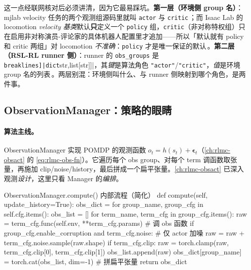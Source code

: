 \begin{insight}\label{ins:rlmc-mgr-asym}
这一点经联网核对后必须讲清，因为它最易踩坑。\textbf{第一层（环境侧 group 名）}：mjlab velocity 任务的两个观测组源码里就叫 \verb|actor| 与 \verb|critic|\,\cite{mjlab2026}；而 Isaac Lab 的 locomotion \emph{velocity 基类}默认\textbf{只}定义一个 \verb|policy| 组，\verb|critic|（非对称特权组）只在启用非对称演员-评论家的具体机器人配置里才追加——所以「默认就有 policy 和 critic 两组」对 locomotion \emph{不准确}：\verb|policy| 才是唯一保证的默认\,\cite{isaaclab2024}。\textbf{第二层（RSL-RL runner 侧）}：runner 的 \verb|obs_groups| 是 \Verb[breaklines]|dict[str,list[str]]|，其\emph{键}是算法角色 \verb|"actor"|/\allowbreak\verb|"critic"|，\emph{值}是环境 group 名的列表\,\cite{schwarke2025rslrl,isaaclab2024}。两层别混：环境侧叫什么、与 runner 侧映射到哪个角色，是两件事。
\end{insight}

\subsection{ObservationManager：策略的眼睛}
\label{sec:rlmc-mgr-obs}

\paragraph{算法主线。}ObservationManager 实现 POMDP 的观测函数 $o_t=h(s_t)+\boldsymbol\epsilon_t$（\cref{ch:rlmc-obsact} 的 \cref{eq:rlmc-obs-fn}）。它遍历每个 obs group、对每个 term 调函数取张量，再施加 clip/noise/history，最后拼成一个扁平张量。\cref{ch:rlmc-obsact} 已深入观测\emph{设计}，这里只看 Manager 的\emph{编排}。

\begin{codebox}[Python]{ObservationManager.compute() 内部流程（简化）}
def compute(self, update_history=True):
    obs_dict = {}
    for group_name, group_cfg in self.cfg.items():
        obs_list = []
        for term_name, term_cfg in group_cfg.items():
            raw = term_cfg.func(self.env, **term_cfg.params)        # 调 obs 函数
            if group_cfg.enable_corruption and term_cfg.noise:     # 仅 actor 加噪
                raw = raw + term_cfg.noise.sample(raw.shape)
            if term_cfg.clip:
                raw = torch.clamp(raw, term_cfg.clip[0], term_cfg.clip[1])
            obs_list.append(raw)
        obs_dict[group_name] = torch.cat(obs_list, dim=-1)         # 拼扁平张量
    return obs_dict
\end{codebox}

